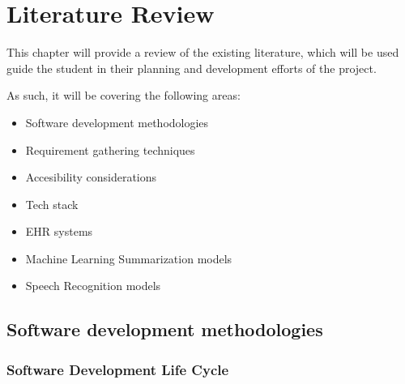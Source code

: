 \chapter{Literature Review}
\label{chap:lit_review}

This chapter will provide a review of the existing literature, which will be used guide the student in their planning and development efforts of the project.

\noindent As such, it will be covering the following areas:
\begin{itemize}
    \item Software development methodologies
    \item Requirement gathering techniques
    \item Accesibility considerations
    \item Tech stack
    \item EHR systems
    \item Machine Learning Summarization models
    \item Speech Recognition models
\end{itemize}


\section{Software development methodologies}

\subsection{Software Development Life Cycle}

